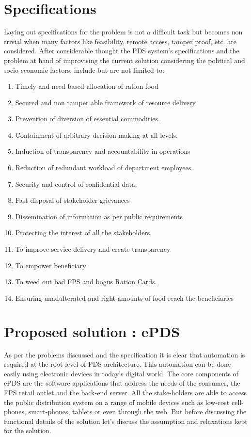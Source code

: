 \documentclass{article}
\begin{document}
\section{Specifications}

Laying out specifications for the problem is not a difficult task but becomes non trivial when many factors like feasibility, remote access, tamper proof, etc. are considered. After considerable thought the PDS system's specifications and the problem at hand of improvising the current solution considering the political and socio-economic factors; include but are not limited to:

\begin{enumerate}
\item Timely and need based allocation of ration food
\item Secured and non tamper able framework of resource delivery 
\item Prevention of diversion of essential commodities. 
\item Containment of arbitrary decision making at all levels. 
\item Induction of transparency and accountability in operations
\item Reduction of redundant workload of department employees. 
\item Security and control of confidential data. 
\item Fast disposal of stakeholder grievances
\item Dissemination of information as per public requirements
\item Protecting the interest of all the stakeholders. 
\item To improve service delivery and create transparency 
\item To empower beneficiary 
\item To weed out bad FPS and bogus Ration Cards. 
\item Ensuring unadulterated and right amounts of food reach the beneficiaries
\end{enumerate}

\section{Proposed solution : ePDS}

As per the problems discussed and the specification it is clear that automation is required at the root level of PDS architecture. This automation can be done easily using electronic devices in today's digital world. The core components of ePDS are the software applications that address the needs of the consumer, the FPS retail outlet and the back-end server. All the stake-holders are able to access the public distribution system on a range of mobile devices such as low-cost cell-phones, smart-phones, tablets or even through the web. But before discussing the functional details of the solution let's discuss the assumption and relaxations kept for the solution.
\end{document}
